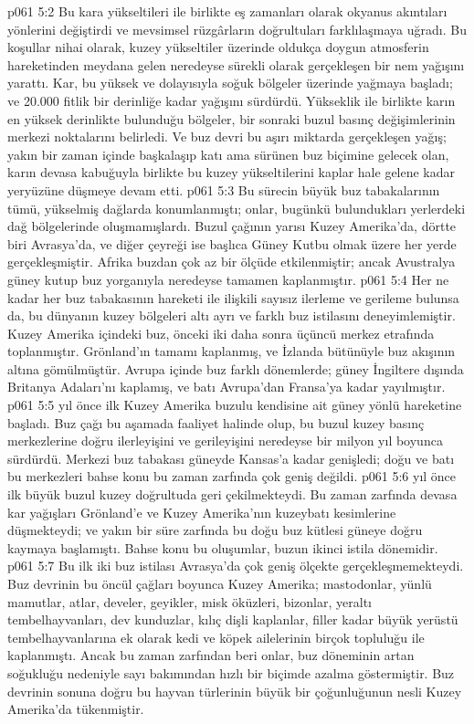 \vs p061 5:2 Bu kara yükseltileri ile birlikte eş zamanları olarak okyanus akıntıları yönlerini değiştirdi ve mevsimsel rüzgârların doğrultuları farklılaşmaya uğradı. Bu koşullar nihai olarak, kuzey yükseltiler üzerinde oldukça doygun atmosferin hareketinden meydana gelen neredeyse sürekli olarak gerçekleşen bir nem yağışını yarattı. Kar, bu yüksek ve dolayısıyla soğuk bölgeler üzerinde yağmaya başladı; ve 20.000 fitlik bir derinliğe kadar yağışını sürdürdü. Yükseklik ile birlikte karın en yüksek derinlikte bulunduğu bölgeler, bir sonraki buzul basınç değişimlerinin merkezi noktalarını belirledi. Ve buz devri bu aşırı miktarda gerçekleşen yağış; yakın bir zaman içinde başkalaşıp katı ama sürünen buz biçimine gelecek olan, karın devasa kabuğuyla birlikte bu kuzey yükseltilerini kaplar hale gelene kadar yeryüzüne düşmeye devam etti.
\vs p061 5:3 Bu sürecin büyük buz tabakalarının tümü, yükselmiş dağlarda konumlanmıştı; onlar, bugünkü bulundukları yerlerdeki dağ bölgelerinde oluşmamışlardı. Buzul çağının yarısı Kuzey Amerika’da, dörtte biri Avrasya’da, ve diğer çeyreği ise başlıca Güney Kutbu olmak üzere her yerde gerçekleşmiştir. Afrika buzdan çok az bir ölçüde etkilenmiştir; ancak Avustralya güney kutup buz yorganıyla neredeyse tamamen kaplanmıştır.
\vs p061 5:4 Her ne kadar her buz tabakasının hareketi ile ilişkili sayısız ilerleme ve gerileme bulunsa da, bu dünyanın kuzey bölgeleri altı ayrı ve farklı buz istilasını deneyimlemiştir. Kuzey Amerika içindeki buz, önceki iki daha sonra üçüncü merkez etrafında toplanmıştır. Grönland’ın tamamı kaplanmış, ve İzlanda bütünüyle buz akışının altına gömülmüştür. Avrupa içinde buz farklı dönemlerde; güney İngiltere dışında Britanya Adaları’nı kaplamış, ve batı Avrupa’dan Fransa’ya kadar yayılmıştır.
\vs p061 5:5  yıl önce ilk Kuzey Amerika buzulu kendisine ait güney yönlü hareketine başladı. Buz çağı bu aşamada faaliyet halinde olup, bu buzul kuzey basınç merkezlerine doğru ilerleyişini ve gerileyişini neredeyse bir milyon yıl boyunca sürdürdü. Merkezi buz tabakası güneyde Kansas’a kadar genişledi; doğu ve batı bu merkezleri bahse konu bu zaman zarfında çok geniş değildi.
\vs p061 5:6  yıl önce ilk büyük buzul kuzey doğrultuda geri çekilmekteydi. Bu zaman zarfında devasa kar yağışları Grönland’e ve Kuzey Amerika’nın kuzeybatı kesimlerine düşmekteydi; ve yakın bir süre zarfında bu doğu buz kütlesi güneye doğru kaymaya başlamıştı. Bahse konu bu oluşumlar, buzun ikinci istila dönemidir.
\vs p061 5:7 Bu ilk iki buz istilası Avrasya’da çok geniş ölçekte gerçekleşmemekteydi. Buz devrinin bu öncül çağları boyunca Kuzey Amerika; mastodonlar, yünlü mamutlar, atlar, develer, geyikler, misk öküzleri, bizonlar, yeraltı tembelhayvanları, dev kunduzlar, kılıç dişli kaplanlar, filler kadar büyük yerüstü tembelhayvanlarına ek olarak kedi ve köpek ailelerinin birçok topluluğu ile kaplanmıştı. Ancak bu zaman zarfından beri onlar, buz döneminin artan soğukluğu nedeniyle sayı bakımından hızlı bir biçimde azalma göstermiştir. Buz devrinin sonuna doğru bu hayvan türlerinin büyük bir çoğunluğunun nesli Kuzey Amerika’da tükenmiştir.
